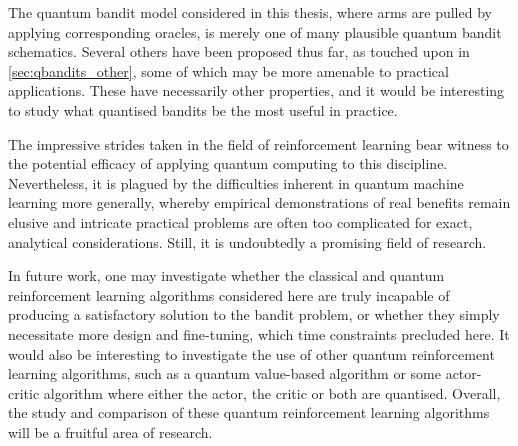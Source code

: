 The quantum bandit model considered in this thesis, where arms are pulled by applying corresponding oracles, is merely one of many plausible quantum bandit schematics.
Several others have been proposed thus far, as touched upon in \cref{sec:qbandits_other}, some of which may be more amenable to practical applications.
These have necessarily other properties, and it would be interesting to study what quantised bandits be the most useful in practice.

The impressive strides taken in the field of reinforcement learning bear witness to the potential efficacy of applying quantum computing to this discipline.
Nevertheless, it is plagued by the difficulties inherent in quantum machine learning more generally, whereby empirical demonstrations of real benefits remain elusive and intricate practical problems are often too complicated for exact, analytical considerations.
Still, it is undoubtedly a promising field of research.

In future work, one may investigate whether the classical and quantum reinforcement learning algorithms considered here are truly incapable of producing a satisfactory solution to the bandit problem, or whether they simply necessitate more design and fine-tuning, which time constraints precluded here.
It would also be interesting to investigate the use of other quantum reinforcement learning algorithms, such as a quantum value-based algorithm or some actor-critic algorithm where either the actor, the critic or both are quantised.
Overall, the study and comparison of these quantum reinforcement learning algorithms will be a fruitful area of research.

